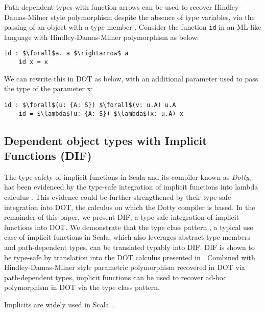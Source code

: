Path-dependent types with function arrows can be used to recover
Hindley-Damas-Milner style polymorphism despite the absence of type variables,
via the passing of an object with a type member \cite{AGORS16}. Consider the
function \texttt{id} in an ML-like language with Hindley-Damas-Milner
polymorphism as below:

\begin{minipage}{\linewidth}
\begin{lstlisting}[mathescape]
    id : $\forall$a. a $\rightarrow$ a
    id x = x
\end{lstlisting}
\end{minipage}

We can rewrite this in DOT as below, with an additional parameter used to pass
the type of the parameter x:

\begin{minipage}{\linewidth}
\begin{lstlisting}[mathescape]
    id : $\forall$(u: {A: S}) $\forall$(v: u.A) u.A
    id = $\lambda$(u: {A: S}) $\lambda$(x: u.A) x
\end{lstlisting}
\end{minipage}

\subsection{Dependent object types with Implicit Functions (DIF)} The type
safety of implicit functions in Scala and its compiler known as \emph{Dotty},
has been evidenced by the type-safe integration of implicit functions into
lambda calculus \cite{OBLB18}. This evidence could be further strengthened by
their type-safe integration into DOT, the calculus on which the Dotty compiler
is based. In the remainder of this paper, we present DIF, a type-safe
integration of implicit functions into DOT. We demonstrate that the type class
pattern \cite{OMO10}, a typical use case of implicit functions in Scala, which
also leverages abstract type members and path-dependent types, can be translated
typably into DIF. DIF is shown to be type-safe by translation into the DOT
calculus presented in \cite{AGORS16}. Combined with Hindley-Damas-Milner style
parametric polymorphism recovered in DOT via path-dependent types, implicit
functions can be used to recover ad-hoc polymorphism in DOT via the type class
pattern.

Implicits are widely used in Scala... 

